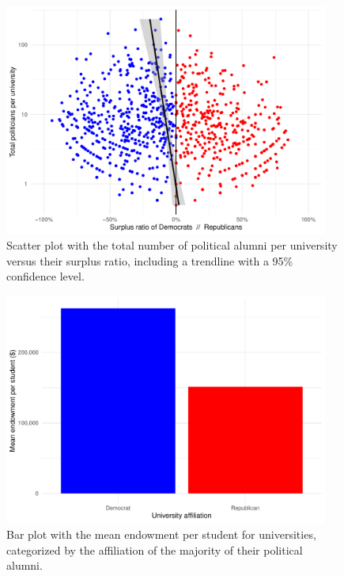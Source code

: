\documentclass{article}
\begin{document}
\begin{figure}[b]
    \centering
    \includegraphics[width=0.95\textwidth]{images/3 surplus_ratio_vs_total_politicians.pdf}
    \caption{Scatter plot with the total number of political alumni per university versus their surplus ratio, including a trendline with a 95\% confidence level.}
    \label{fig:3}
\end{figure}

\begin{figure}[b]
    \centering
    \includegraphics[width=0.95\textwidth]{images/4 endowment_per_university_affiliation_mean.pdf}
    \caption{Bar plot with the mean endowment per student for universities, categorized by the affiliation of the majority of their political alumni.}
    \label{fig:4}
\end{figure}
\end{document}
